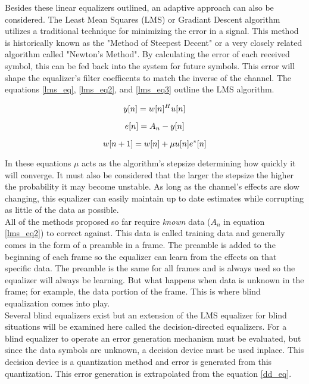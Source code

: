 Besides these linear equalizers outlined, an adaptive approach can also be considered.  The Least Mean Squares (LMS) or Gradiant Descent algorithm utilizes a traditional technique for minimizing the error in a signal.  This method is historically known as the "Method of Steepest Decent" or a very closely related algorithm called "Newton's Method". By calculating the error of each received symbol, this can be fed back into the system for future symbols.  This error will shape the equalizer's filter coefficents to match the inverse of the channel.  The equations \ref{lms_eq}, \ref{lms_eq2}, and \ref{lms_eq3} outline the LMS algorithm.

\begin{equation}\label{lms_eq}
y[n]=w[n]^{H}u[n]\\
\end{equation}

\begin{equation}\label{lms_eq2}
e[n]=A_{n}-y[n]\\
\end{equation}

\begin{equation}\label{lms_eq3}
w[n+1]=w[n]+\mu u[n]e^{*}[n]\\ 
\end{equation}

In these equations \(\mu\) acts as the algorithm's stepsize determining how quickly it will converge.  It must also be considered that the larger the stepsize the higher the probability it may become unstable.  As long as the channel's effects are slow changing, this equalizer can easily maintain up to date estimates while corrupting as little of the data as possible.\\  

All of the methods proposed so far require \textit{known} data (\(A_{n}\) in equation \ref{lms_eq2}) to correct against.  This data is called training data and generally comes in the form of a preamble in a frame.  The preamble is added to the beginning of each frame so the equalizer can learn from the effects on that specific data.  The preamble is the same for all frames and is always used so the equalizer will always be learning.  But what happens when data is unknown in the frame; for example, the data portion of the frame.  This is where blind equalization comes into play.\\

Several blind equalizers exist but an extension of the LMS equalizer for blind situations will be examined here called the decision-directed equalizers.  For a blind equalizer to operate an error generation mechanism must be evaluated, but since the data symbols are unknown, a decision device must be used inplace.  This decision device is a quantization method and error is generated from this quantization.  This error generation is extrapolated from the equation \ref{dd_eq}.

